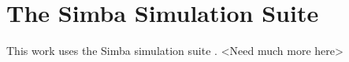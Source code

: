 \section{The Simba Simulation Suite}

This work uses the Simba simulation suite \citep{}. <Need much more here>